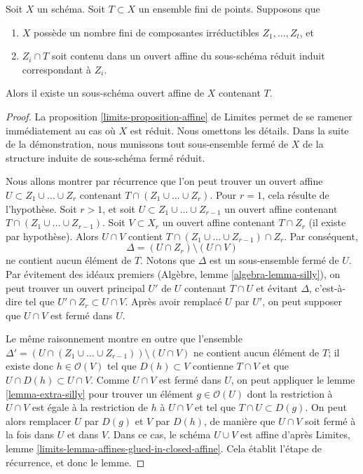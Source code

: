 \begin{lemma}
\label{lemma-finite-set-codim-1-points-in-affine-per-component}
Soit $X$ un schéma. Soit $T \subset X$ un ensemble fini de points. Supposons que
\begin{enumerate}
\item $X$ possède un nombre fini de composantes irréductibles $Z_1, \ldots, Z_t$, et
\item $Z_i \cap T$ soit contenu dans un ouvert affine du sous-schéma
réduit induit correspondant à $Z_i$.
\end{enumerate}
Alors il existe un sous-schéma ouvert affine de $X$ contenant $T$.
\end{lemma}

\begin{proof}
La proposition \ref{limits-proposition-affine} de Limites
permet de se ramener immédiatement au cas où $X$
est réduit. Nous omettons les détails. Dans la suite de la démonstration, nous
munissons tout sous-ensemble fermé de $X$ de la structure induite de sous-schéma
fermé réduit.

\medskip\noindent
Nous allons montrer par récurrence que l'on peut trouver un ouvert affine
$U \subset Z_1 \cup \ldots \cup Z_r$ contenant
$T \cap (Z_1 \cup \ldots \cup Z_r)$. Pour $r = 1$, cela résulte de l'hypothèse.
Soit $r > 1$, et soit $U \subset Z_1 \cup \ldots \cup Z_{r -  1}$
un ouvert affine contenant $T \cap (Z_1 \cup \ldots \cup Z_{r - 1})$.
Soit $V \subset X_r$ un ouvert affine contenant $T \cap Z_r$ (il existe par
hypothèse). Alors $U \cap V$ contient
$T \cap ( Z_1 \cup \ldots \cup Z_{r - 1} ) \cap Z_r$.
Par conséquent,
$$
\Delta = (U \cap Z_r) \setminus (U \cap V)
$$
ne contient aucun élément de $T$. Notons que $\Delta$ est un sous-ensemble fermé
de $U$. Par évitement des idéaux premiers (Algèbre, lemme \ref{algebra-lemma-silly}),
on peut trouver un ouvert principal $U'$ de $U$ contenant $T \cap U$ et évitant
$\Delta$, c'est-à-dire tel que $U' \cap Z_r \subset U \cap V$.
Après avoir remplacé $U$ par $U'$, on peut supposer que $U \cap V$ est
fermé dans $U$.

\medskip\noindent
Le même raisonnement montre en outre que l'ensemble
$\Delta' = (U \cap (Z_1 \cup \ldots \cup Z_{r - 1})) \setminus (U \cap V)$
ne contient aucun élément de $T$; il existe donc $h \in \mathcal{O}(V)$
tel que $D(h) \subset V$ contienne $T \cap V$ et que
$U \cap D(h) \subset U \cap V$. Comme $U \cap V$ est fermé dans $U$,
on peut appliquer le lemme \ref{lemma-extra-silly}
pour trouver un élément $g \in \mathcal{O}(U)$ dont la restriction à $U \cap V$
est égale à la restriction de $h$ à $U \cap V$ et tel que
$T \cap U \subset D(g)$. On peut alors remplacer $U$ par $D(g)$
et $V$ par $D(h)$, de manière que $U \cap V$ soit
fermé à la fois dans $U$ et dans $V$. Dans ce cas, le schéma $U \cup V$ est
affine d'après Limites, lemme \ref{limits-lemma-affines-glued-in-closed-affine}.
Cela établit l'étape de récurrence, et donc le lemme.
\end{proof}

